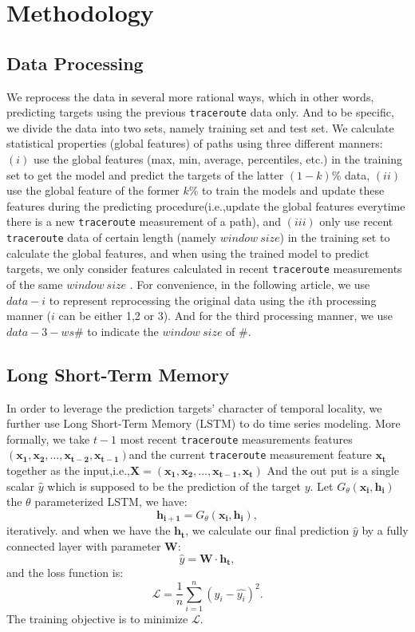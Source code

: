 \documentclass[sigconf]{acmart}
\begin{document}
	\section{Methodology}
	\subsection{Data Processing}
	We reprocess the data in several more rational ways, which in other words, predicting targets using the previous \texttt{traceroute} data only. And to be specific, we divide the data into two sets, namely training set and test set. We calculate statistical properties (global features) of paths using three different manners: $(i)$ use the global features (max, min, average, percentiles, etc.) in the training set to get the model and predict the targets of the latter $(1-k)\%$ data, $(ii)$ use the global feature of the former $k\%$ to train the models and update these features during the predicting procedure(i.e.,update the global features everytime there is a new \texttt{traceroute} measurement of a path), and $(iii)$ only use recent \texttt{traceroute} data of certain length (namely $window\ size$) in the training set to calculate the global features, and when using the trained model to predict targets, we only consider features calculated in  recent \texttt{traceroute} measurements of the same $window\ size$ . For convenience, in the following article, we use $data-i$ to represent reprocessing the original data using the $i$th processing manner ($i$ can be either 1,2 or 3). And for the third processing manner, we use $data-3-ws\#$ to indicate the $window\ size$ of $\#$.
	
	\subsection{Long Short-Term Memory}
	In order to leverage the prediction targets' character of temporal locality, we further use Long Short-Term Memory (LSTM) to do time series modeling. More formally, we take $t-1$ most recent \texttt{traceroute} measurements features $(\mathbf{x_1},\mathbf{x_2},...,\mathbf{x_{t-2}},\mathbf{x_{t-1}})$and the current \texttt{traceroute} measurement feature $\mathbf{x_t}$ together as the input,i.e.,$\mathbf{X}=(\mathbf{x_1},\mathbf{x_2},...,\mathbf{x_{t-1}},\mathbf{x_{t}})$ And the out put is a single scalar $\hat{y}$ which is supposed to be the prediction of the target $y$.
	Let $G_{\theta}(\mathbf{x_i},\mathbf{h_i})$ the $\theta$ parameterized LSTM, we have:
	\begin{equation}
	\mathbf{h_{i+1}}=G_{\theta}(\mathbf{x_i},\mathbf{h_i}),
	\end{equation}iteratively. and when we have the $\mathbf{h_{t}}$, we calculate our final prediction $\hat{y}$ by a fully connected layer with parameter $\mathbf{W}$:
	\begin{equation}
	\hat{y}=\mathbf{W}\cdot\mathbf{h_t},
	\end{equation}
	and the loss function is:
	\begin{equation}
	\mathcal{L}=\frac{1}{n}\sum_{i=1}^{n}(y_i-\hat{y_i})^2.
	\end{equation}
	The training objective is to minimize $\mathcal{L}$.
	
\end{document}
